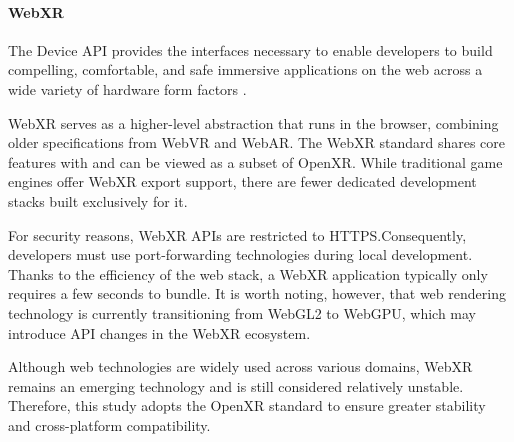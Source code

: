 \paragraph{WebXR}

The Device API provides the interfaces necessary to enable developers to build compelling, comfortable, and safe immersive applications on the web across a wide variety of hardware form factors \parencite{w3c2022webxr}.

WebXR serves as a higher-level abstraction that runs in the browser, combining older specifications from WebVR and WebAR. The WebXR standard shares core features with and can be viewed as a subset of OpenXR. While traditional game engines offer WebXR export support, there are fewer dedicated development stacks built exclusively for it. 

For security reasons, WebXR APIs are restricted to HTTPS.Consequently, developers must use port-forwarding technologies during local development. Thanks to the efficiency of the web stack, a WebXR application typically only requires a few seconds to bundle. It is worth noting, however, that web rendering technology is currently transitioning from WebGL2 to WebGPU, which may introduce API changes in the WebXR ecosystem.

Although web technologies are widely used across various domains, WebXR remains an emerging technology and is still considered relatively unstable. Therefore, this study adopts the OpenXR standard to ensure greater stability and cross-platform compatibility.
